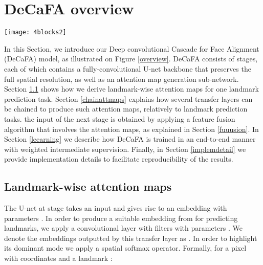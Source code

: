 \documentclass[10pt,twocolumn,letterpaper]{article}
\begin{document}
\section{DeCaFA overview}

\begin{figure*}[h!]
	\centering
	\texttt{[image: 4blocks2]}
	\caption{DeCaFA architecture overview. Several stages with fully-convolutional U-nets are stacked, multiple transfer layers are chained and intermediate supervision with increasing weights is applied to produce landmark estimates for heterogeneous alignment tasks. Landmark-wise attention maps are fused with the input image and the embeddings of the previous stage U-net to enable end-to-end cascaded alignment.}
	\label{overview}
\end{figure*}

In this Section, we introduce our Deep convolutional Cascade for Face Alignment (DeCaFA) model, as illustrated on Figure \ref{overview}. DeCaFA consists of  stages, each of which contains a fully-convolutional U-net backbone that preserves the full spatial resolution, as well as an attention map generation sub-network. Section \ref{attmaps} shows how we derive landmark-wise attention maps for one landmark prediction task. Section \ref{chainattmaps} explains how several transfer layers can be chained to produce such attention maps, relatively to  landmark prediction tasks. the input of the next stage is obtained by applying a feature fusion algorithm that involves the attention maps, as explained in Section \ref{fuuusion}. In Section \ref{leearning} we describe how DeCaFA is trained in an end-to-end manner with weighted intermediate supervision. Finally, in Section \ref{implemdetail} we provide implementation details to facilitate reproducibility of the results.

\subsection{Landmark-wise attention maps}\label{attmaps}

The U-net at stage  takes an input  and gives rise to an embedding  with parameters . In order to produce a suitable embedding from  for predicting  landmarks, we apply a  convolutional layer with  filters with parameters . We denote the embeddings outputted by this transfer layer as .
In order to highlight its dominant mode we apply a spatial softmax operator. Formally, for a pixel with coordinates  and a landmark :
\end{document}
